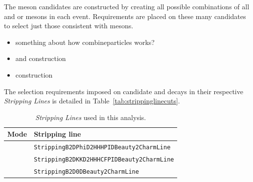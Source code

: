 
The \Bp meson candidates are constructed by creating all possible combinations of all \Dsp and \phiz or \Dzb mesons in each event.
Requirements are placed on these many candidates to select just those consistent with \Bp mesons.


{\color{Red}
\begin{itemize}
\item something about how combineparticles works?
\item \Dsp and \phiz construction 
\item \Bp construction
\end{itemize}
}


The selection requirements imposed on candidate \decay{\Bp}{\Dsp\phiz} and \decay{\Bp}{\Dsp\Kp\Km} decays in their respective \emph{Stripping Lines} is detailed in Table~\ref{tab:strippinglinecuts}. 


\begin{table}[t]
   \begin{center}
      \begin{tabular}{l l}
         \hline
         Mode & Stripping line \\ 
         \hline
         \decay{\Bp}{\Dsp\phiz}        & \texttt{StrippingB2DPhiD2HHHPIDBeauty2CharmLine}    \\
         \decay{\Bp}{\Dsp\Kp\Km}       & \texttt{StrippingB2DKKD2HHHCFPIDBeauty2CharmLine}   \\
         \decay{\Bp}{\Dsp\Dzb}         & \texttt{StrippingB2D0DBeauty2CharmLine}             \\
         \hline
      \end{tabular}
   \end{center}
   \caption{\emph{Stripping Lines} used in this analysis.}
   \label{tab:strippinglines}
\end{table}





